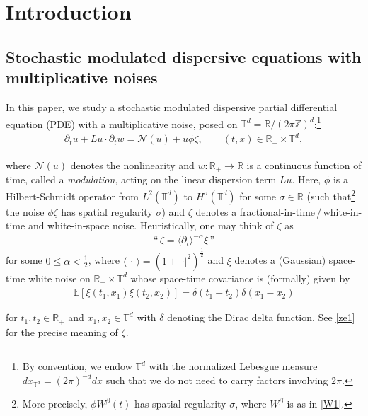 \documentclass[letterpaper, 11pt,  reqno]{amsart}
\newcommand{\1}{\hspace{0.5mm}\textup{I}\hspace{0.5mm}}
\newcommand{\noi}{\noindent}
\newcommand{\Z}{\mathbb{Z}}
\newcommand{\R}{\mathbb{R}}
\newcommand{\T}{\mathbb{T}}
\let\P= \undefined
\newcommand{\P}{\mathbf{P}}
\newcommand{\E}{\mathbb{E}}
\newcommand{\al}{\alpha}
\newcommand{\be}{\beta}
\newcommand{\dl}{\delta}
\newcommand{\s}{\sigma}
\newcommand{\dt}{\partial_t}
\newcommand{\jb}[1]
{\langle #1 \rangle}
\newcommand{\NN}{\mathcal{N}}
\newcommand{\z}{\zeta}
\numberwithin{equation}{section}
\numberwithin{theorem}{section}
\begin{document}
\section{Introduction}\label{SEC:1}
\subsection{Stochastic modulated dispersive equations with multiplicative noises}
In this paper, we study  a stochastic modulated dispersive 
partial differential equation (PDE)
with a multiplicative noise, 
posed on $  \T^d = \R/ (2\pi \Z)^d$:\footnote{By convention, we endow
$\T^d$ with the normalized Lebesgue measure $ dx_{\T^d} =  (2\pi)^{-d}dx$
such that we do not need to carry factors involving $2\pi$.}
\begin{align}
\dt u +  L u \cdot \dt w=  \NN(u)  + u \phi\zeta, 
\qquad ( t, x) \in \R_+ \times \T^d,
\label{ME1}
\end{align}


\noi
where
 $\NN(u)$ denotes the nonlinearity
 and 
 $w:\R_+\to\R$ is a continuous function of time, 
called a {\it modulation}, 
 acting on the linear dispersion term $Lu$.
Here, 
$\phi$ is a Hilbert-Schmidt operator from $L^2(\T^d)$ to %
$H^\s(\T^d)$ 
for some $\s \in \R$  
(such that\footnote{More precisely, $\phi W^\be(t)$ has spatial regularity $\s$, 
where $W^\be$ is as in \eqref{W1}.}
 the noise $\phi \zeta$ has spatial regularity $\s$)
and $\zeta$ denotes a fractional-in-time\,/\,white-in-time and white-in-space noise.
Heuristically, one may think of $\zeta$ as 
\begin{align}
\text{``}\,\z = \jb{\dt}^{-\al}\xi\,\text{''}
\label{W0a}
\end{align}
for some $0 \le \al <  \frac 12$, where 
$\jb{\,\cdot\,} = (1+ |\cdot|^2)^\frac12$ and 
$\xi$ denotes 
a (Gaussian) space-time white noise on $\R_+ \times \T^d$
whose space-time covariance is (formally) given by 
\begin{align*}
 \E[ \xi(t_1, x_1)\xi(t_2, x_2) ] = \dl(t_1 - t_2) \dl (x_1 - x_2)
\end{align*} 

\noi
for $t_1, t_2 \in \R_+$  and $x_1, x_2 \in \T^d$
with $\dl$ denoting the Dirac delta function.
See \eqref{ze1}
for the precise meaning of $\z$.
\end{document}

